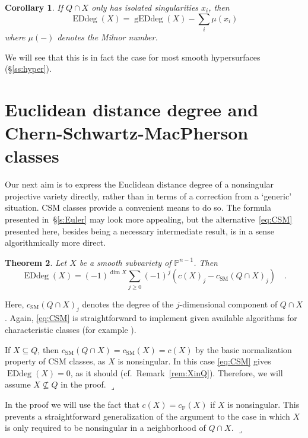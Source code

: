 \documentclass[11pt]{amsart}
\newtheorem{theorem}{Theorem}[section]
\newtheorem{corol}[theorem]{Corollary}
\numberwithin{equation}{section}
\newcommand{\Pbb}{{\mathbb{P}}}
\newcommand{\csm}{{c_{\text{SM}}}}
\newcommand{\cf}{{c_{\text{F}}}}
\DeclareMathOperator{\Edd}{EDdeg}
\DeclareMathOperator{\gEdd}{gEDdeg}
\newcommand{\qede}{\hfill$\lrcorner$}
\begin{document}
\begin{corol}\label{cor:isol}
If $Q\cap X$ only has isolated singularities $x_i$, then
\[
\Edd(X) = \gEdd(X) - \sum_i \mu(x_i)
\]
where $\mu(-)$ denotes the Milnor number.
\end{corol}

We will see that this is in fact the case for most smooth hypersurfaces (\S\ref{ss:hyper}).


\section{Euclidean distance degree and Chern-Schwartz-MacPherson classes}\label{s:CSM}
Our next aim is to express the Euclidean distance degree of a nonsingular projective
variety directly, rather than in terms of a correction from a `generic' situation. CSM classes
provide a convenient means to do so. The formula presented in~\S\ref{s:Euler} may look
more appealing, but the alternative~\eqref{eq:CSM} presented here, besides being a
necessary intermediate result, is in a sense algorithmically more direct. 

\begin{theorem}\label{thm:CSM}
Let $X$ be a smooth subvariety of $\Pbb^{n-1}$. Then 
\begin{equation}\label{eq:CSM}
\Edd(X) = (-1)^{\dim X} \sum_{j\ge 0} (-1)^j\left(c(X)_j-\csm(Q\cap X)_j\right)\quad.
\end{equation}
\end{theorem}
Here, $\csm(Q\cap X)_j$ denotes the degree of the $j$-dimensional component of
$Q\cap X$. Again, \eqref{eq:CSM} is straightforward to implement given available
algorithms for characteristic classes (for example \cite{MR1956868,MR3484270,
Harris201726}).

\begin{remark}
If $X\subseteq Q$, then $\csm(Q\cap X)= \csm(X)=c(X)$ by the basic normalization 
property of CSM classes, as $X$ is nonsingular. In this case \eqref{eq:CSM} gives 
$\Edd(X)=0$, as it should (cf.~Remark~\ref{rem:XinQ}). Therefore, we will assume 
$X\not\subseteq Q$ in the proof.
\qede\end{remark}

\begin{remark}
In the proof we will use the fact that $c(X)=\cf(X)$ if $X$ is nonsingular. This prevents
a straightforward generalization of the argument to the case in which $X$ is only
required to be nonsingular in a neighborhood of $Q\cap X$.
\qede\end{remark}
\end{document}
